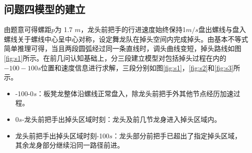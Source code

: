 \documentclass[withoutpreface,bwprint]{cumcmthesis}
\begin{document}
\subsection{问题四模型的建立}
由题意可得螺距$p$为 1.7 $m$，龙头前把手的行进速度始终保持1$m/s$盘出螺线与盘入螺线关于螺线中心呈中心对称，设定舞龙队在掉头空间内完成掉头。由基本不等式简单推理可得，当且两段圆弧经过同一条直线时，调头曲线变短，掉头路线如图\ref{fig:s1}所示。在前几问认知基础上，分三段建立模型对包括掉头过程在内的$-100-100s$位置和速度信息进行求解，三段分别如图\ref{fig:s1}，\ref{fig:s2}和\ref{fig:s3}所示。
\begin{itemize}
	\item -100-0$s$：板凳龙整体沿螺线正常盘入，除龙头前把手外其他节点经历加速过程。
	\item 0$s$-龙头前把手出掉头区域时刻：龙头及前几节龙身进入掉头区域内。
	\item 龙头前把手出掉头区域时刻-100$s$：龙头部分前把手已超出了指定掉头区域，其余龙身部分继续沿同一路径前进。
\end{itemize}
\end{document}
